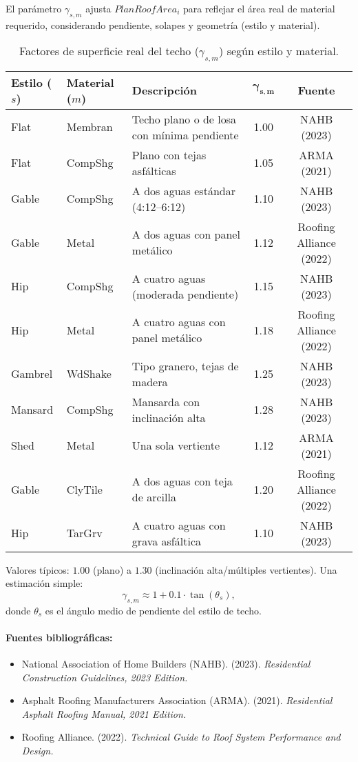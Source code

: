 El parámetro $\gamma_{s,m}$ ajusta $PlanRoofArea_i$ para reflejar el área real de material requerido, considerando
pendiente, solapes y geometría (estilo y material).
\begin{table}[H]
\centering
\caption{Factores de superficie real del techo ($\gamma_{s,m}$) según estilo y material.}
\label{tab:roof_gamma}
\begin{tabular}{lllcc}
\toprule
\textbf{Estilo ($s$)} & \textbf{Material ($m$)} & \textbf{Descripción} & $\boldsymbol{\gamma_{s,m}}$ & \textbf{Fuente}\\
\midrule
Flat        & Membran      & Techo plano o de losa con mínima pendiente & 1.00 & NAHB (2023)\\
Flat        & CompShg      & Plano con tejas asfálticas & 1.05 & ARMA (2021)\\
Gable       & CompShg      & A dos aguas estándar (4:12–6:12) & 1.10 & NAHB (2023)\\
Gable       & Metal        & A dos aguas con panel metálico & 1.12 & Roofing Alliance (2022)\\
Hip         & CompShg      & A cuatro aguas (moderada pendiente) & 1.15 & NAHB (2023)\\
Hip         & Metal        & A cuatro aguas con panel metálico & 1.18 & Roofing Alliance (2022)\\
Gambrel     & WdShake      & Tipo granero, tejas de madera & 1.25 & NAHB (2023)\\
Mansard     & CompShg      & Mansarda con inclinación alta & 1.28 & NAHB (2023)\\
Shed        & Metal        & Una sola vertiente & 1.12 & ARMA (2021)\\
Gable       & ClyTile      & A dos aguas con teja de arcilla & 1.20 & Roofing Alliance (2022)\\
Hip         & TarGrv       & A cuatro aguas con grava asfáltica & 1.10 & NAHB (2023)\\
\bottomrule
\end{tabular}
\end{table}

Valores típicos: $1.00$ (plano) a $1.30$ (inclinación alta/múltiples vertientes). Una estimación simple:
\[
\gamma_{s,m} \approx 1 + 0.1 \cdot \tan(\theta_s),
\]
donde $\theta_s$ es el ángulo medio de pendiente del estilo de techo.

\paragraph{Fuentes bibliográficas:}
\begin{itemize}
    \item National Association of Home Builders (NAHB). (2023). \textit{Residential Construction Guidelines, 2023 Edition.}
    \item Asphalt Roofing Manufacturers Association (ARMA). (2021). \textit{Residential Asphalt Roofing Manual, 2021 Edition.}
    \item Roofing Alliance. (2022). \textit{Technical Guide to Roof System Performance and Design.}
\end{itemize}

